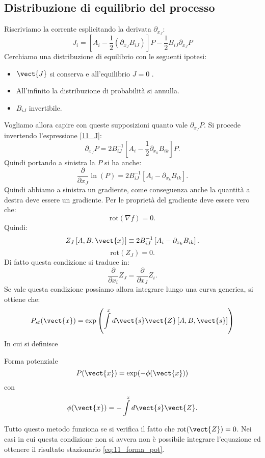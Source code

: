 \subsection{Distribuzione di equilibrio del processo}%
\label{sub:Distribuzione di equilibrio del processo}
Riscriviamo la corrente esplicitando la derivata $\partial_{x_J}$:
\begin{equation}
    J_i = \left[A_i-\frac{1}{2}\left(\partial_{x_J}B_{iJ}\right)\right]P - \frac{1}{2} B_{iJ}\partial_{x_J}P
    \label{eq:11_J}
\end{equation}
Cerchiamo una distribuzione di equilibrio con le seguenti ipotesi:
\begin{itemize}
    \item $\vect{J}$ si conserva e all'equilibrio $J=0$ .
    \item All'infinito la distribuzione di probabilità si annulla.
    \item $B_{iJ}$ invertibile.
\end{itemize}
Vogliamo allora capire con queste supposizioni quanto vale $\partial_{x_J}P$.
Si procede invertendo l'espressione \ref{11_J}:
\[
    \partial_{x_J}P = 2B^{-1}_{iJ}\left[A_i-\frac{1}{2}\partial_{x_k}B_{ik}\right]P
.\] 
Quindi portando a sinistra la $P$ si ha anche:
\[
    \frac{\partial }{\partial x_J} \ln (P) = 2B_{iJ}^{-1}\left[A_i-\partial_{x_k}B_{ik}\right]
.\] 
Quindi abbiamo a sinistra un gradiente, come conseguenza anche la quantità a destra deve essere un gradiente.
Per le proprietà del gradiente deve essere vero che:
\[
    \text{rot}(\nabla f)  = 0
.\] 
Quindi:
\[
    Z_J\left[A,B, \vect{x}\right] \equiv 2B_{iJ}^{-1}\left[A_i - \partial_{x_k}B_{ik}\right]
.\] 
\[
    \text{rot}(Z_J) = 0
.\] 
Di fatto questa condizione si traduce in:
\[
  \frac{\partial }{\partial x_i} Z_J = \frac{\partial }{\partial x_J} Z_i  
.\] 
Se vale questa condizione possiamo allora integrare lungo una curva generica, si ottiene che:
\[
    P_{st}(\vect{x}) = \exp\left(\int\limits^{x} d\vect{s}\vect{Z}\left[A,B, \vect{s}\right]\right)
\] 
In cui si definisce 
\begin{redbox}{Forma potenziale}
    \begin{equation}
	P(\vect{x})  = \exp (-\phi (\vect{x})) 
	\label{eq:11_forma_pot}
    \end{equation}
    con 
     \[
	\phi (\vect{x}) = - \int\limits^{x} d\vect{s}\vect{Z} 
    .\] 
\end{redbox}
\noindent
Tutto questo metodo funziona se si verifica il fatto che $\text{rot}(\vect{Z}) = 0$. Nei casi in cui questa condizione non si avvera non è possibile integrare l'equazione ed ottenere il risultato stazionario \ref{eq:11_forma_pot}.
